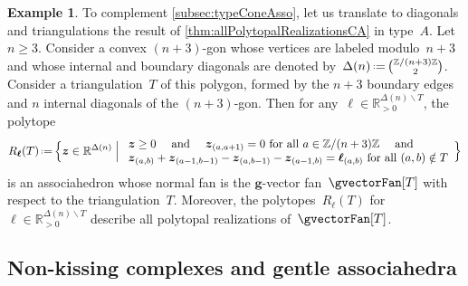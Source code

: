 \documentclass{amsart}
\theoremstyle{definition}
\newtheorem{example}[theorem]{Example}
\newcommand{\R}{\mathbb{R}} %
\newcommand{\Z}{\mathbb{Z}} %
\renewcommand{\b}[1]{{\boldsymbol{#1}}} %
\newcommand{\Bigset}[2]{\Big\{ #1 \;\Big|\; #2 \Big\}} %
\newcommand{\ssm}{\smallsetminus} %
\newcommand{\eqdef}{\mbox{\,\raisebox{0.2ex}{\scriptsize\ensuremath{\mathrm:}}\ensuremath{=}\,}} %
\newcommand{\vincent}[1]{\todo[color=blue!30]{#1 \\ \hfill --- V.}}
\begin{document}
\begin{example}
To complement \cref{subsec:typeConeAsso}, let us translate to diagonals and triangulations the result of \cref{thm:allPolytopalRealizationsCA} in type~$A$.
Let~$n \ge 3$.
Consider a convex $(n+3)$-gon whose vertices are labeled modulo~$n+3$ and whose internal and boundary diagonals are denoted by~$\Delta(n) \eqdef \binom{\Z/(n+3)\Z}{2}$.
Consider a triangulation~$T$ of this polygon, formed by the $n+3$ boundary edges and $n$ internal diagonals of the $(n+3)$-gon.
Then for any~$\b{\ell} \in \R_{>0}^{\Delta(n) \ssm T}$, the polytope
\[
R_\b{\ell}(T) \eqdef \Bigset{\b{z} \in \R^{\Delta(n)}}{\begin{array}{l} \b{z} \ge 0 \quad\text{ and }\quad \b{z}_{(a,a+1)} = 0 \text{ for all } a \in \Z/(n+3)\Z \quad\text{ and }\quad \\ \b{z}_{(a,b)} + \b{z}_{(a-1,b-1)} - \b{z}_{(a,b-1)} - \b{z}_{(a-1,b)} = \b{\ell}_{(a,b)} \text{ for all } (a,b) \notin T \end{array}}
\]
is an associahedron whose normal fan is the $\b{g}$-vector fan~$\gvectorFan[T]$ with respect to the triangulation~$T$.
Moreover, the polytopes~$R_\b{\ell}(T)$ for~$\b{\ell} \in \R_{>0}^{\Delta(n) \ssm T}$ describe all polytopal realizations of~$\gvectorFan[T]$.
\end{example}



\subsection{Non-kissing complexes and gentle associahedra}
\label{subsec:typeConeNKC}
\end{document}
